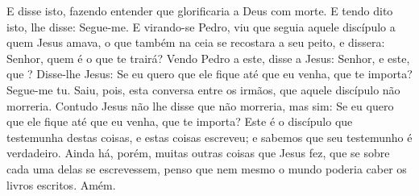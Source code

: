 {E disse isto, fazendo entender que
{} glorificaria a Deus com
{} morte. E tendo dito isto,
{} lhe disse: Segue-me.
E virando-se Pedro, viu que
{} seguia aquele discípulo a quem Jesus amava, o que também na ceia se recostara a seu peito, e dissera: Senhor, quem é o que te trairá?
Vendo Pedro a este, disse a Jesus: Senhor, e este, que
{} ?
Disse-lhe Jesus: Se eu quero que ele fique até que eu venha, que te importa? Segue-me tu.
Saiu, pois, esta conversa entre os irmãos, que aquele discípulo não morreria. Contudo Jesus não lhe disse que não morreria, mas sim: Se eu quero que ele fique até que eu venha, que te importa?
Este é o discípulo que testemunha destas coisas, e estas coisas escreveu; e sabemos que seu testemunho é verdadeiro.
Ainda há, porém, muitas outras coisas que Jesus fez, que se sobre cada uma delas se escrevessem, penso que nem mesmo o mundo poderia caber os livros escritos. Amém.\par }